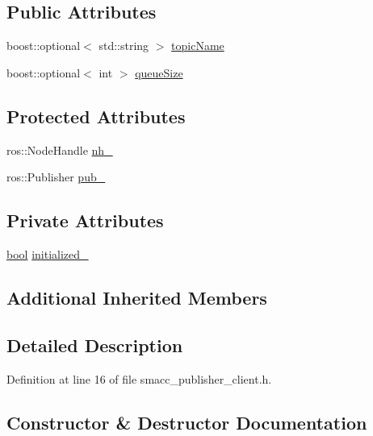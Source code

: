 \subsection*{Public Attributes}
\begin{DoxyCompactItemize}
\item 
boost\+::optional$<$ std\+::string $>$ \hyperlink{classsmacc_1_1client__bases_1_1SmaccPublisherClient_a8b8d98aef9b3b3a441005d2cb17b4fcc}{topic\+Name}
\item 
boost\+::optional$<$ int $>$ \hyperlink{classsmacc_1_1client__bases_1_1SmaccPublisherClient_a1a9b98681b01953f134191799a029fd3}{queue\+Size}
\end{DoxyCompactItemize}
\subsection*{Protected Attributes}
\begin{DoxyCompactItemize}
\item 
ros\+::\+Node\+Handle \hyperlink{classsmacc_1_1client__bases_1_1SmaccPublisherClient_a83a44b5a1afd4d45140d4936f4011cc9}{nh\+\_\+}
\item 
ros\+::\+Publisher \hyperlink{classsmacc_1_1client__bases_1_1SmaccPublisherClient_af39f498e73e8f956aae312065a4fd093}{pub\+\_\+}
\end{DoxyCompactItemize}
\subsection*{Private Attributes}
\begin{DoxyCompactItemize}
\item 
\hyperlink{classbool}{bool} \hyperlink{classsmacc_1_1client__bases_1_1SmaccPublisherClient_acb2fbd8b9797ce286d9ecc0419e2cc55}{initialized\+\_\+}
\end{DoxyCompactItemize}
\subsection*{Additional Inherited Members}


\subsection{Detailed Description}


Definition at line 16 of file smacc\+\_\+publisher\+\_\+client.\+h.



\subsection{Constructor \& Destructor Documentation}
\mbox{\label{classsmacc_1_1client__bases_1_1SmaccPublisherClient_ac1713f185a2b81c6143a8fea042d53fa}} 
